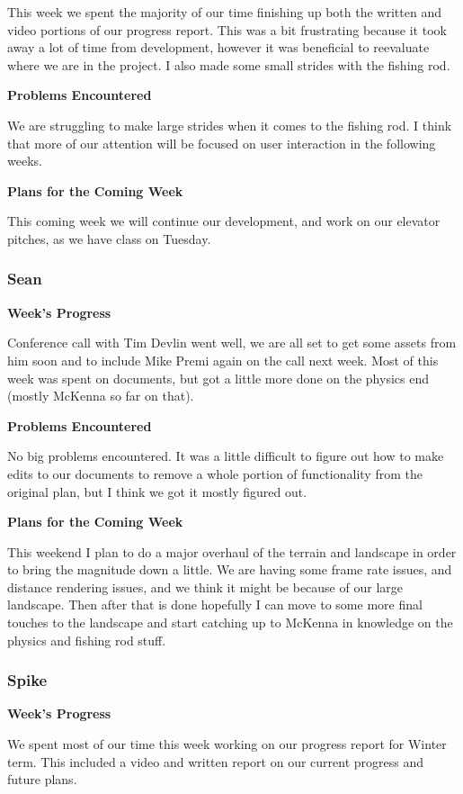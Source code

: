 \documentclass[10pt,journal,compsoc,onecolumn, draftclsnofoot]{IEEEtran}
\begin{document}
This week we spent the majority of our time finishing up both the written and video portions of our progress report. This was a bit frustrating because it took away a lot of time from development, however it was beneficial to reevaluate where we are in the project. I also made some small strides with the fishing rod.

\noindent \textbf{Problems Encountered}

We are struggling to make large strides when it comes to the fishing rod. I think that more of our attention will be focused on user interaction in the following weeks.

\noindent \textbf{Plans for the Coming Week}

This coming week we will continue our development, and work on our elevator pitches, as we have class on Tuesday.

\subsubsection{Sean}
\noindent \textbf{Week's Progress}

Conference call with Tim Devlin went well, we are all set to get some assets from him soon and to include Mike Premi again on the call next week.  Most of this week was spent on documents, but got a little more done on the physics end (mostly McKenna so far on that).

\noindent \textbf{Problems Encountered}

No big problems encountered.  It was a little difficult to figure out how to make edits to our documents to remove a whole portion of functionality from the original plan, but I think we got it mostly figured out.

\noindent \textbf{Plans for the Coming Week}

This weekend I plan to do a major overhaul of the terrain and landscape in order to bring the magnitude down a little.  We are having some frame rate issues, and distance rendering issues, and we think it might be because of our large landscape. Then after that is done hopefully I can move to some more final touches to the landscape and start catching up to McKenna in knowledge on the physics and fishing rod stuff.

\subsubsection{Spike}
\noindent \textbf{Week's Progress}

We spent most of our time this week working on our progress report for Winter term. This included a video and written report on our current progress and future plans.
\end{document}
